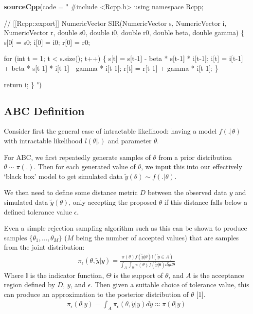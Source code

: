 \documentclass[
]{article}
\newenvironment{Shaded}{\begin{snugshade}}{\end{snugshade}}
\newcommand{\AttributeTok}[1]{\textcolor[rgb]{0.13,0.29,0.53}{#1}}
\newcommand{\FunctionTok}[1]{\textcolor[rgb]{0.13,0.29,0.53}{\textbf{#1}}}
\newcommand{\NormalTok}[1]{#1}
\newcommand{\StringTok}[1]{\textcolor[rgb]{0.31,0.60,0.02}{#1}}
\begin{document}
\begin{Shaded}
\begin{Highlighting}[]
\FunctionTok{sourceCpp}\NormalTok{(}\AttributeTok{code =} \StringTok{"}
\StringTok{  \#include \textless{}Rcpp.h\textgreater{}}
\StringTok{  using namespace Rcpp;}

\StringTok{  // [[Rcpp::export]]}
\StringTok{  NumericVector SIR(NumericVector s, NumericVector i, NumericVector r, double s0, double i0, double r0, double beta, double gamma) \{}
\StringTok{    s[0] = s0;}
\StringTok{    i[0] = i0;}
\StringTok{    r[0] = r0;}

\StringTok{    for (int t = 1; t \textless{} s.size(); t++) \{}
\StringTok{      s[t] = s[t{-}1] {-} beta * s[t{-}1] * i[t{-}1];}
\StringTok{      i[t] = i[t{-}1] + beta * s[t{-}1] * i[t{-}1] {-} gamma * i[t{-}1];}
\StringTok{      r[t] = r[t{-}1] + gamma * i[t{-}1];}
\StringTok{    \}}

\StringTok{    return i;}
\StringTok{  \}}
\StringTok{"}\NormalTok{)}
\end{Highlighting}
\end{Shaded}

\hypertarget{abc-definition}{%
\subsection{ABC Definition}\label{abc-definition}}

Consider first the general case of intractable likelihood: having a
model \(f(.|\theta)\) with intractable likelihood \(l(\theta|.)\) and
parameter \(\theta\).

For ABC, we first repeatedly generate samples of \(\theta\) from a prior
distribution \(\theta \sim \pi(.)\). Then for each generated value of
\(\theta\), we input this into our effectively `black box' model to get
simulated data \(\tilde{y}(\theta) \sim f(.|\theta)\).

We then need to define some distance metric \(D\) between the observed
data \(y\) and simulated data \(\tilde{y}(\theta)\), only accepting the
proposed \(\theta\) if this distance falls below a defined tolerance
value \(\epsilon\).

Even a simple rejection sampling algorithm such as this can be shown to
produce samples \(\{\theta_1,...,\theta_M\}\) (\(M\) being the number of
accepted values) that are samples from the joint distribution:\[
\begin{align*}
    \pi_{\epsilon}(\theta,\tilde{y}|y) = \frac{\pi(\theta)f(\tilde{y}|\theta)\mathbb{I}(\tilde{y}\in A)}{\int_A\int_\Theta\pi(\theta)f(\tilde{y}|\theta) d \tilde{y} d \theta}
\end{align*}\] Where \(\mathbb{I}\) is the indicator function,
\(\Theta\) is the support of \(\theta\), and \(A\) is the acceptance
region defined by \(D\), \(y\), and \(\epsilon\). Then given a suitable
choice of tolerance value, this can produce an approximation to the
posterior distribution of \(\theta\) {[}1{]}.\[
\begin{align*}
    \pi_{\epsilon}(\theta|y) = \int_A\pi_{\epsilon}(\theta,\tilde{y}|y)d\tilde{y} \approx \pi(\theta|y)
\end{align*}\]
\end{document}
